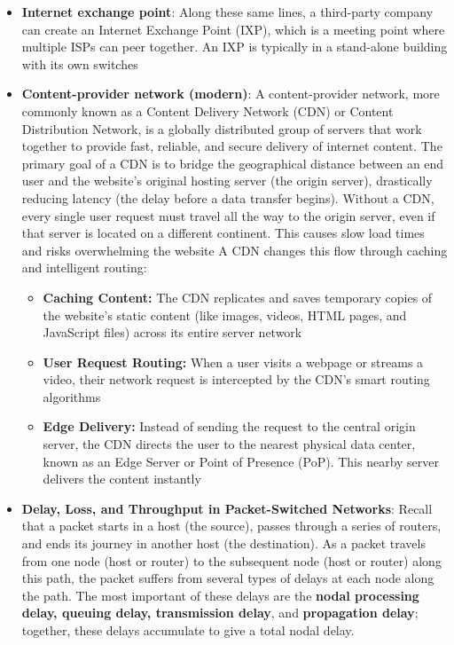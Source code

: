 \documentclass{report}
\begin{document}
\begin{itemize}
        \item \textbf{Internet exchange point}: Along these same lines, a third-party company can create an Internet Exchange Point (IXP), which is a meeting point where multiple ISPs can peer together. An IXP is typically in a stand-alone building with its own switches
        \item \textbf{Content-provider network (modern)}: A content-provider network, more commonly known as a Content Delivery Network (CDN) or Content Distribution Network, is a globally distributed group of servers that work together to provide fast, reliable, and secure delivery of internet content.
            \bigbreak \noindent 
            The primary goal of a CDN is to bridge the geographical distance between an end user and the website's original hosting server (the origin server), drastically reducing latency (the delay before a data transfer begins).
            \bigbreak \noindent 
            Without a CDN, every single user request must travel all the way to the origin server, even if that server is located on a different continent. This causes slow load times and risks overwhelming the website
            \bigbreak \noindent 
            A CDN changes this flow through caching and intelligent routing:
            \begin{itemize}
                \item \textbf{Caching Content:} The CDN replicates and saves temporary copies of the website’s static content (like images, videos, HTML pages, and JavaScript files) across its entire server network
                \item \textbf{User Request Routing:} When a user visits a webpage or streams a video, their network request is intercepted by the CDN's smart routing algorithms
                \item \textbf{Edge Delivery:} Instead of sending the request to the central origin server, the CDN directs the user to the nearest physical data center, known as an Edge Server or Point of Presence (PoP). This nearby server delivers the content instantly
            \end{itemize}
        \item \textbf{Delay, Loss, and Throughput in Packet-Switched Networks}: Recall that a packet starts in a host (the source), passes through a series of routers, and ends its journey in another host (the destination). As a packet travels from one node (host or router) to the subsequent node (host or router) along this path, the packet suffers from several types of delays at each node along the path. The most important of these delays are the \textbf{nodal processing delay, queuing delay, transmission delay}, and \textbf{propagation delay}; together, these delays accumulate to give a total nodal delay.

\end{itemize}
\end{document}
